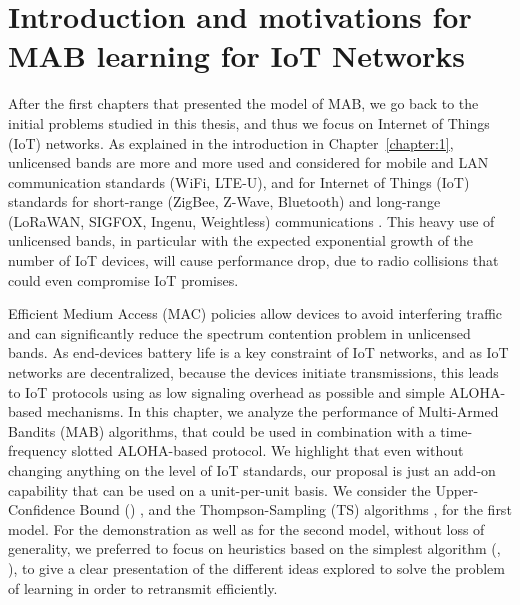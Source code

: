\section{Introduction and motivations for MAB learning for IoT Networks}
\label{sec:4:motivations}

After the first chapters that presented the model of MAB, we go back to the initial problems studied in this thesis, and thus we focus on Internet of Things (IoT) networks.
%
As explained in the introduction in Chapter~\ref{chapter:1},
unlicensed bands are more and more used and considered for mobile and LAN communication standards (WiFi, LTE-U), and for Internet of Things (IoT) standards for short-range (ZigBee, Z-Wave, Bluetooth) and long-range (LoRaWAN, SIGFOX, Ingenu, Weightless) communications \cite{Centenaro16}.
This heavy use of unlicensed bands, in particular with the expected exponential growth of the number of IoT devices, will cause performance drop, due to radio collisions that could even compromise IoT promises.

Efficient Medium Access (MAC) policies allow devices to avoid interfering traffic and can significantly reduce the spectrum contention problem in unlicensed bands.
As end-devices battery life is a key constraint of IoT networks,
and as IoT networks are decentralized, because the devices initiate transmissions,
this leads to IoT protocols using as low signaling overhead as possible and simple ALOHA-based mechanisms.
%
In this chapter, we analyze the performance of Multi-Armed Bandits (MAB) algorithms, that could be used in combination with a time-frequency slotted ALOHA-based protocol.
We highlight that even without changing anything on the level of IoT standards, our proposal is just an add-on capability that can be used on a unit-per-unit basis.
We consider the Upper-Confidence Bound (\UCB) \cite{Auer02}, and the Thompson-Sampling (TS) algorithms \cite{Thompson33,AgrawalGoyal11,
Kaufmann12Thompson}, for the first model. For the demonstration as well as for the second model, without loss of generality, we preferred to focus on heuristics based on the simplest algorithm (\ie, \UCB), to give a clear presentation of the different ideas explored to solve the problem of learning in order to retransmit efficiently.

